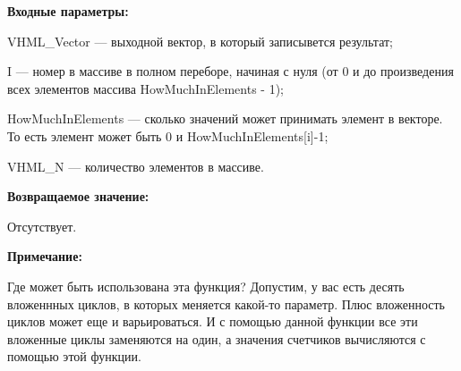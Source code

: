 \textbf{Входные параметры:}

VHML\_Vector --- выходной вектор, в который записывется результат;
 
I --- номер в массиве в полном переборе, начиная с нуля (от 0 и до произведения всех элементов массива HowMuchInElements - 1);
 
HowMuchInElements --- сколько значений может принимать элемент в векторе. То есть элемент может быть 0 и HowMuchInElements[i]-1;
 
VHML\_N --- количество элементов в массиве.

\textbf{Возвращаемое значение:}
 
Отсутствует.

\textbf{Примечание:}
 
Где может быть использована эта функция? Допустим, у вас есть десять вложеннных циклов, в которых меняется какой-то параметр. Плюс вложенность циклов может еще и варьироваться. И с помощью данной функции все эти вложенные циклы заменяются на один, а значения счетчиков вычисляются с помощью этой функции.